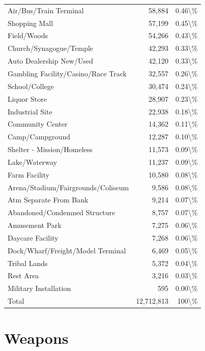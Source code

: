 \documentclass[
  12pt,
  openany]{book}
\begin{document}
\begin{longtable}[t]{lrr}
Air/Bus/Train Terminal & 58,884 & 0.46\textbackslash{}\%\\
Shopping Mall & 57,199 & 0.45\textbackslash{}\%\\
\addlinespace
Field/Woods & 54,266 & 0.43\textbackslash{}\%\\
Church/Synagogue/Temple & 42,293 & 0.33\textbackslash{}\%\\
Auto Dealership New/Used & 42,120 & 0.33\textbackslash{}\%\\
Gambling Facility/Casino/Race Track & 32,557 & 0.26\textbackslash{}\%\\
School/College & 30,474 & 0.24\textbackslash{}\%\\
\addlinespace
Liquor Store & 28,907 & 0.23\textbackslash{}\%\\
Industrial Site & 22,938 & 0.18\textbackslash{}\%\\
Community Center & 14,362 & 0.11\textbackslash{}\%\\
Camp/Campground & 12,287 & 0.10\textbackslash{}\%\\
Shelter - Mission/Homeless & 11,573 & 0.09\textbackslash{}\%\\
\addlinespace
Lake/Waterway & 11,237 & 0.09\textbackslash{}\%\\
Farm Facility & 10,580 & 0.08\textbackslash{}\%\\
Arena/Stadium/Fairgrounds/Coliseum & 9,586 & 0.08\textbackslash{}\%\\
Atm Separate From Bank & 9,214 & 0.07\textbackslash{}\%\\
Abandoned/Condemned Structure & 8,757 & 0.07\textbackslash{}\%\\
\addlinespace
Amusement Park & 7,275 & 0.06\textbackslash{}\%\\
Daycare Facility & 7,268 & 0.06\textbackslash{}\%\\
Dock/Wharf/Freight/Model Terminal & 6,469 & 0.05\textbackslash{}\%\\
Tribal Lands & 5,372 & 0.04\textbackslash{}\%\\
Rest Area & 3,216 & 0.03\textbackslash{}\%\\
\addlinespace
Military Installation & 595 & 0.00\textbackslash{}\%\\
Total & 12,712,813 & 100\textbackslash{}\%\\
\bottomrule
\end{longtable}

\section{Weapons}\label{offenseWeapons}
\end{document}
